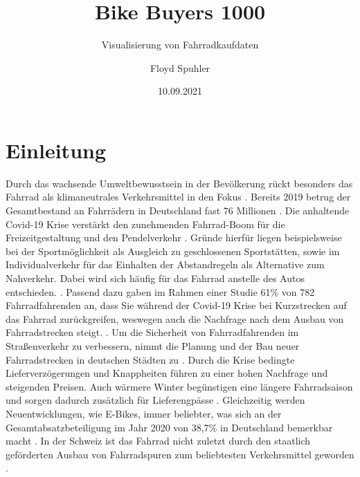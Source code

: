 \documentclass[usegeometry=true]{scrartcl}
\begin{document}
\subject{Projektbericht zum Modul Information Retrieval und Visualisierung Sommersemester 2021}

\title{Bike Buyers 1000}
\subtitle{Visualisierung von Fahrradkaufdaten}
\author{Floyd Spuhler}%


\date{10.09.2021}
\maketitle%
\thispagestyle{empty}
\newpage
\thispagestyle{empty}
\tableofcontents
\newpage
{}
\section{Einleitung}
Durch das wachsende Umweltbewusstsein in der Bevölkerung rückt besonders das Fahrrad als klimaneutrales Verkehrsmittel in den Fokus \cite{Marquart.2021}. Bereits 2019 betrug der Gesamtbestand an Fahrrädern in Deutschland fast 76 Millionen \cite{Kords.26.06.2020,Statista.25.08.2021}. Die anhaltende Covid-19 Krise verstärkt den zunehmenden Fahrrad-Boom für die Freizeitgestaltung und den Pendelverkehr \cite{Platter.2020}. Gründe hierfür liegen beispielsweise bei der Sportmöglichkeit als Ausgleich zu geschlossenen Sportstätten, sowie im Individualverkehr für das Einhalten der Abstandregeln als Alternative zum Nahverkehr. Dabei wird sich häufig für das Fahrrad anstelle des Autos entschieden. \cite{Kollner.30.12.2020,Thomannbusse.24.11.2020}. Passend dazu gaben im Rahmen einer Studie 61\%  von 782 Fahrradfahrenden an, dass Sie während der Covid-19 Krise bei Kurzstrecken auf das Fahrrad zurückgreifen, weswegen auch die Nachfrage nach dem Ausbau von Fahrradstrecken steigt. \cite{sinus.2021}. Um die Sicherheit von Fahrradfahrenden im Straßenverkehr zu verbessern, nimmt die Planung und der Bau neuer Fahrradstrecken in deutschen Städten zu \cite{sinus.2021,ADAC.05.09.2021,Muenchen.de.05.09.2021}. Durch die Krise bedingte Lieferverzögerungen und Knappheiten führen zu einer hohen Nachfrage und steigenden Preisen. Auch wärmere Winter begünstigen eine längere Fahrradsaison und sorgen dadurch zusätzlich für Lieferengpässe \cite{tagesschau.11.03.2021}. Gleichzeitig werden Neuentwicklungen, wie E-Bikes, immer beliebter, was sich an der Gesamtabsatzbeteiligung im Jahr 2020 von 38,7\% in Deutschland bemerkbar macht \cite{tagesschau.11.03.2021}. 
In der Schweiz ist das Fahrrad nicht zuletzt durch den staatlich geförderten Ausbau von Fahrradspuren zum beliebtesten Verkehrsmittel geworden \cite{Platter.2020}.
\end{document}
